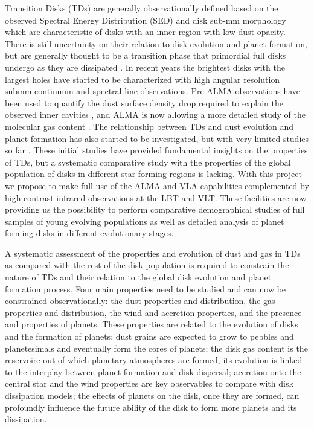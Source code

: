 \documentclass[10pt,fleqn,twoside]{article}
\begin{document}
Transition Disks (TDs) are generally observationally defined based on the observed Spectral Energy
Distribution (SED) and disk sub-mm morphology which are characteristic of disks with an inner region
with low dust opacity. There is still uncertainty on their relation 
to disk evolution and planet formation, but are generally thought to be a transition phase that
primordial full disks undergo as they are dissipated \citep[see e.g.\ ][]{2011ARA&A..49...67W}. In recent 
years the brightest disks with the largest holes have started to be characterized with high angular resolution submm continuum and spectral line observations. 
Pre-ALMA observations have been used to quantify the dust surface density drop required to 
explain the observed inner cavities \citep[e.g.\ ][]{2011ApJ...732...42A}, and ALMA is now allowing a more 
detailed study of the molecular gas content \citep[e.g.\ ][]{2015A&A...579A.106V}. 
The relationship between TDs and dust evolution and planet formation has also started to be investigated,
but with very limited studies so far \citep[e.g.\ ][]{2014A&A...564A..51P,2015Natur.527..342S}.
These initial studies have provided fundamental insights on the properties of TDs, but a 
systematic comparative study with the properties of the global population of disks in different 
star forming regions is lacking. With this project we propose to make full use of the ALMA and VLA capabilities complemented by high contrast infrared observations at the LBT and VLT. These facilities 
are now providing us the possibility to perform comparative demographical studies of full samples of young evolving populations as well as detailed analysis of planet forming disks in different evolutionary stages. 

A systematic assessment of the properties and evolution of dust and gas in TDs as compared with the rest of the disk population is required to constrain the nature of TDs and their relation to the global disk evolution and planet formation process. Four main properties need to be studied and can now be constrained 
observationally: the dust properties and distribution, the gas properties and distribution, the wind and accretion properties, and the presence and properties of planets. These properties are related to the evolution of disks and the formation of planets: dust grains are expected to grow to pebbles and planetesimals and eventually form the cores of planets; the disk gas content is the reservoire out of which planetary atmospheres are formed, its evolution is linked to the interplay between planet formation and disk dispersal; accretion onto the central star and the wind properties are key observables to compare with disk dissipation models; the effects of planets on the disk, once they are formed, can profoundly influence the future ability of the disk to form more planets and its dissipation.
\end{document}
